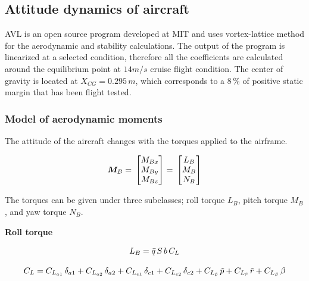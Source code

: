 \subsection{Attitude dynamics of aircraft}

AVL is an open source program developed at MIT and uses vortex-lattice method for the aerodynamic and stability calculations.
The output of the program is linearized at a selected condition, therefore all the coefficients are calculated around the equilibrium point at $14m/s$ cruise flight condition.
The center of gravity is located at $X_{CG}= 0.295\,m$, which corresponds to a $8\,\%$ of positive static margin that has been flight tested. %


\subsubsection{Model of aerodynamic moments}

The attitude of the aircraft changes with the torques applied to the airframe. 

\begin{equation}{\label{eqn:torqueTotal}}
\bm{M}_B
= \,
\begin{bmatrix}
M_{Bx} \\
M_{By}\\
M_{Bz}\\
\end{bmatrix}
= \,
\begin{bmatrix}
L_{B} \\
M_{B}\\
N_{B}\\
\end{bmatrix}
\end{equation}

The torques can be given under three subclasses; roll torque $L_B$, pitch torque $M_B$, and yaw torque $N_B$.




\textbf{Roll torque}

\begin{equation}{\label{eqn:rollTorque}}
L_B = \bar{q} \, S \, b \, C_L
\end{equation}

\begin{equation}{\label{eqn:bigCraftC_L}}
C_L = C_{L_{a1}} \, \delta_{a1} + C_{L_{a2}} \, \delta_{a2} + C_{L_{e1}} \, \delta_{e1} + C_{L_{e2}} \, \delta_{e2} + C_{L_{\tilde{p}}} \, \tilde{p} + C_{L_{\tilde{r}}} \, \tilde{r} +  C_{L_\beta} \, \beta 
\end{equation}

